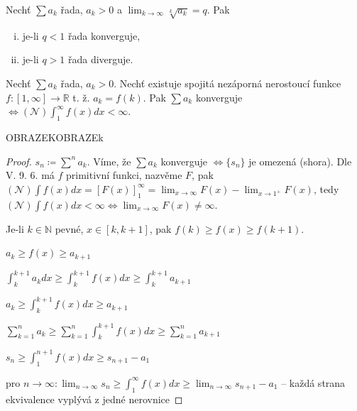 \begin{veta}
  Nechť $\sum a_k$ řada, $a_k >0$ a $\lim_{k\to \infty} \sqrt[k]{a_k}=q$. Pak

\begin{enumerate}[i)]
  \item je-li $q<1$ řada konverguje,
  \item je-li $q>1$ řada diverguje.
\end{enumerate}
\end{veta}

\begin{veta}
  Nechť $\sum a_k$ řada, $a_k > 0$. Nechť existuje spojitá nezáporná nerostoucí funkce $f: [1, \infty] \to \mathbb R$ t. ž. $a_k = f(k)$. Pak $\sum a_k$ konverguje $\iff (\mathscr N) \int_1^\infty f(x)dx <\infty$.
\end{veta}
OBRAZEKOBRAZEk

\begin{proof}
  $s_n \coloneq \sum^n a_k$. Víme, že $\sum a_k$ konverguje $\iff \{s_n\}$ je omezená (shora). Dle V. 9. 6. má $f$ primitivní funkci, nazvěme $F$, pak $(\mathscr N)\int f(x)dx = [F(x)]_1^\infty = \lim_{x \to \infty} F(x) - \lim_{x \to 1^+} F(x)$, tedy $(\mathscr N)\int f(x) dx < \infty \iff \lim_{x \to \infty} F(x) \neq \infty$.

  Je-li $k \in \mathbb N$ pevné, $x \in [k, k+1]$, pak $f(k) \geq f(x) \geq f(k+1)$.

  $a_k \geq f(x) \geq a_{k+1}$

  $\int_k^{k+1} a_k dx \geq \int_k^{k+1} f(x) dx \geq \int_k^{k+1} a_{k+1}$

  $a_k \geq \int_k^{k+1} f(x) dx \geq a_{k+1}$

  $\sum_{k=1}^n a_k \geq \sum_{k=1}^n \int_k^{k+1} f(x) dx \geq \sum_{k=1}^n a_{k+1}$

  $s_n \geq \int_1^{n+1} f(x) dx \geq s_{n+1} -a_1$

  pro $ n \to \infty: \lim_{n \to \infty} s_n \geq \int_1^\infty f(x) dx \geq \lim_{n \to \infty} s_{n+1}-a_1$ -- každá strana ekvivalence vyplývá z jedné nerovnice
\end{proof}

